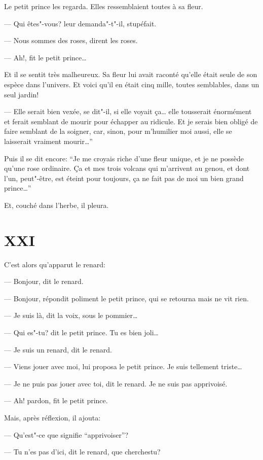 \begin{Parallel}[p]{}{}
{Le petit prince les regarda. Elles ressemblaient
toutes à sa fleur.

--- Qui êtes"-vous? leur demanda"-t"-il, stupéfait.

--- Nous sommes des roses, dirent les roses.

--- Ah!, fit le petit prince\ldots{}

Et il se sentit très malheureux. Sa fleur lui avait
raconté qu'elle était seule de son espèce dans l'univers. Et voici qu'il en était cinq mille, toutes semblables, dans un seul jardin!

--- Elle serait bien vexée, se dit"-il, si elle voyait ça\ldots{} elle tousserait énormément et ferait semblant de
mourir pour échapper au ridicule. Et je serais bien
obligé de faire semblant de la soigner, car, sinon,
pour m'humilier moi aussi, elle se laisserait vraiment mourir\ldots{}''

Puis il se dit encore: ``Je me croyais riche d'une
fleur unique, et je ne possède qu'une rose ordinaire. Ça et mes trois volcans qui m'arrivent au
genou, et dont l'un, peut"-être, est éteint pour toujours, ça ne fait pas de moi un bien grand prince\ldots{}''

Et, couché dans l'herbe, il pleura.

\section{XXI}

C'est alors qu'apparut le renard:

--- Bonjour, dit le renard.

--- Bonjour, répondit poliment le petit prince,
qui se retourna mais ne vit rien.

--- Je suis là, dit la voix, sous le pommier\ldots{}

--- Qui es"-tu? dit le petit prince. Tu es bien joli\ldots{}

--- Je suis un renard, dit le renard.

--- Viens jouer avec moi, lui proposa le petit
prince. Je suis tellement triste\ldots{}

--- Je ne puis pas jouer avec toi, dit le renard. Je
ne suis pas apprivoisé.

--- Ah! pardon, fit le petit prince.

Mais, après réflexion, il ajouta:

--- Qu'est"-ce que signifie ``apprivoiser''?

--- Tu n'es pas d'ici, dit le renard, que cherchestu?

}
\end{Parallel}
